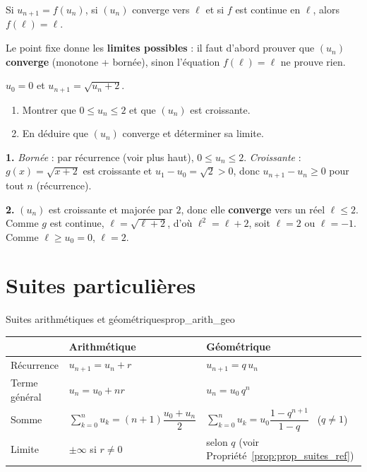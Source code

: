 \begin{theoreme}
	Si $u_{n+1}=f(u_n)$, si $(u_n)$ converge vers $\ell$ et si $f$ est continue
	en $\ell$, alors $f(\ell)=\ell$.
\end{theoreme}

\begin{attention}
	Le point fixe donne les \textbf{limites possibles} : il faut d'abord
	prouver que $(u_n)$ \textbf{converge} (monotone + bornée), sinon
	l'équation $f(\ell)=\ell$ ne prouve rien.
\end{attention}

\exerciceresolu
$u_0=0$ et $u_{n+1}=\sqrt{u_n+2}$.
\begin{enumerate}
	\item Montrer que $0\leq u_n\leq 2$ et que $(u_n)$ est croissante.
	\item En déduire que $(u_n)$ converge et déterminer sa limite.
\end{enumerate}

\solution

\textbf{1.} \emph{Bornée} : par récurrence (voir plus haut), $0\leq u_n\leq 2$.
\emph{Croissante} : $g(x)=\sqrt{x+2}$ est croissante et $u_1-u_0=\sqrt2>0$,
donc $u_{n+1}-u_n\geq 0$ pour tout $n$ (récurrence).

\textbf{2.} $(u_n)$ est croissante et majorée par $2$, donc elle
\textbf{converge} vers un réel $\ell\leq 2$. Comme $g$ est continue,
$\ell=\sqrt{\ell+2}$, d'où $\ell^{2}=\ell+2$, soit $\ell=2$ ou $\ell=-1$.
Comme $\ell\geq u_0=0$, $\ell=2$.


\section{Suites particulières}

\begin{propriete}{Suites arithmétiques et géométriques}{prop_arith_geo}
	\begin{center}
	\renewcommand{\arraystretch}{1.7}
	\begin{tabular}{>{\raggedright\arraybackslash}p{2.3cm}
	                >{\centering\arraybackslash}p{2.6cm}
	                >{\raggedright\arraybackslash}p{3.4cm}}
	\hline
	& \textbf{Arithmétique} & \textbf{Géométrique} \\
	\hline
	Récurrence  & $u_{n+1}=u_n+r$      & $u_{n+1}=q\,u_n$ \\
	Terme général & $u_n=u_0+nr$       & $u_n=u_0\,q^{n}$ \\
	Somme
	& $\displaystyle\sum_{k=0}^{n}u_k=(n+1)\dfrac{u_0+u_n}{2}$
	& $\displaystyle\sum_{k=0}^{n}u_k=u_0\dfrac{1-q^{n+1}}{1-q}$ \ ($q\neq1$) \\
	Limite
	& $\pm\infty$ si $r\neq0$
	& selon $q$ (voir Propriété~\ref{prop:prop_suites_ref}) \\
	\hline
	\end{tabular}
	\end{center}
\end{propriete}

